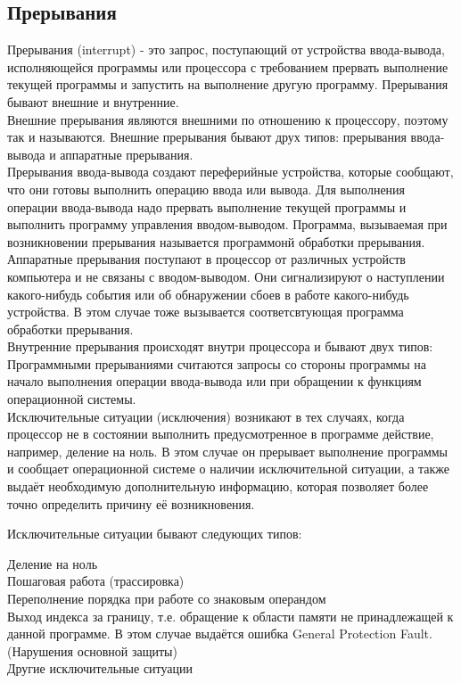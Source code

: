 \documentclass[a4paper]{article}
\begin{document}
\subsection{Прерывания}
Прерывания (interrupt) - это запрос, поступающий от устройства ввода-вывода, исполняющейся программы или процессора с требованием прервать выполнение текущей программы и запустить на выполнение другую программу. Прерывания бывают внешние и внутренние.\\
Внешние прерывания являются внешними по отношению к процессору, поэтому так и называются. Внешние прерывания бывают друх типов: прерывания ввода-вывода и аппаратные прерывания.\\
Прерывания ввода-вывода создают переферийные устройства, которые сообщают, что они готовы выполнить операцию ввода или вывода. Для выполнения операции ввода-вывода надо прервать выполнение текущей программы и выполнить программу управления вводом-выводом. Программа, вызываемая при возникновении прерывания называется программонй обработки прерывания.\\
Аппаратные прерывания поступают в процессор от различных устройств компьютера и не связаны с вводом-выводом. Они сигнализируют о наступлении какого-нибудь события или об обнаружении сбоев в работе какого-нибудь устройства. В этом случае тоже вызывается соответсвтующая программа обработки прерывания.\\
Внутренние прерывания происходят внутри процессора и бывают двух типов:\\
Программными прерываниями считаются запросы со стороны программы на начало выполнения операции ввода-вывода или при обращении к функциям операционной системы.\\
Исключительные ситуации (исключения) возникают в тех случаях, когда процессор не в состоянии выполнить предусмотренное в программе действие, например, деление на ноль. В этом случае он прерывает выполнение программы и сообщает операционной системе о наличии исключительной ситуации, а также выдаёт необходимую дополнительную информацию, которая позволяет более точно определить причину её возникновения.\\
\begin{center}	
	Исключительные ситуации бывают следующих типов:\\
\end{center}
Деление на ноль\\
Пошаговая работа (трассировка)\\
Переполнение порядка при работе со знаковым операндом\\
Выход индекса за границу, т.е. обращение к области памяти не принадлежащей к данной программе. В этом случае выдаётся ошибка General Protection Fault. (Нарушения основной защиты)\\
Другие исключительные ситуации\\
\end{document}
